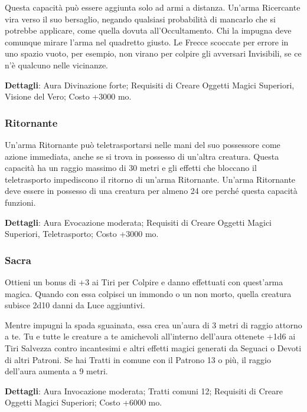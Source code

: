 \begin{multicols}{2}
	Questa capacità può essere aggiunta solo ad armi a distanza. Un'arma Ricercante vira verso il suo bersaglio, negando qualsiasi probabilità di mancarlo che si potrebbe applicare, come quella dovuta all'Occultamento. Chi la impugna deve comunque mirare l'arma nel quadretto giusto. Le Frecce scoccate per errore in uno spazio vuoto, per esempio, non virano per colpire gli avversari Invisibili, se ce n'è qualcuno nelle vicinanze.

	\textbf{Dettagli}: Aura Divinazione forte; Requisiti di Creare Oggetti Magici Superiori, Visione del Vero; Costo +3000 mo.

	\subsubsection*{Ritornante}

	Un'arma Ritornante può teletrasportarsi nelle mani del suo possessore come azione immediata, anche se si trova in possesso di un'altra creatura. Questa capacità ha un raggio massimo di 30 metri e gli effetti che bloccano il teletrasporto impediscono il ritorno di un'arma Ritornante. Un'arma Ritornante deve essere in possesso di una creatura per almeno 24 ore perché questa capacità funzioni.

	\textbf{Dettagli}: Aura Evocazione moderata; Requisiti di Creare Oggetti Magici Superiori, Teletrasporto; Costo +3000 mo.

	\subsubsection*{Sacra}

	Ottieni un bonus di +3 ai Tiri per Colpire e danno effettuati con quest'arma magica. Quando con essa colpisci un immondo o un non morto, quella creatura subisce 2d10 danni da Luce aggiuntivi.

	Mentre impugni la spada sguainata, essa crea un'aura di 3 metri di raggio attorno a te. Tu e tutte le creature a te amichevoli all'interno dell'aura ottenete +1d6 ai Tiri Salvezza contro incantesimi e altri effetti magici generati da Seguaci o Devoti di altri Patroni. Se hai Tratti in comune con il Patrono 13 o più, il raggio dell'aura aumenta a 9 metri.

	\textbf{Dettagli}: Aura Invocazione moderata; Tratti comuni 12; Requisiti di Creare Oggetti Magici Superiori; Costo +6000 mo.




\end{multicols}

